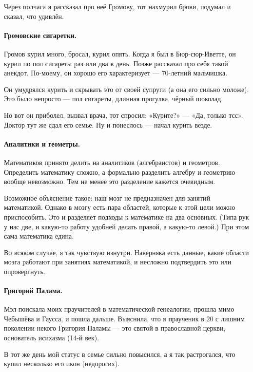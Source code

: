 \documentclass{book}
\begin{document}
Через полчаса я рассказал про неё Громову, тот нахмурил брови, подумал и сказал, что удивлён.

\paragraph{Громовские сигаретки.}
Громов курил много, бросал, курил опять.
Когда я был в Бюр-сюр-Иветте, он курил по пол сигареты раз или два в день.
Позже рассказал про себя такой анекдот.
По-моему, он хорошо его характеризует --- 70-летний мальчишка.

Он умудрялся курить и скрывать это от своей супруги (а она его сильно моложе).
Это было непросто --- пол сигареты, длинная прогулка, чёрный шоколад.

Но вот он приболел, вызвал врача, тот спросил: «Курите?» --- «Да, только тсс».
Доктор тут же сдал его семье.
Ну и понеслось --- начал курить везде.

\paragraph{Аналитики и геометры.}
Математиков принято делить на аналитиков (алгебраистов) и геометров.
Определить математику сложно, а формально разделить алгебру и геометрию вообще невозможно.
Тем не менее это разделение кажется очевидным.

Возможное объяснение такое:
наш мозг не предназначен для занятий математикой.
Однако в мозгу есть пара областей, которые к этой цели можно приспособить.
Это и разделяет подходы к математике на два основных.
(Типа рук у нас две, и какую-то работу удобней делать правой, а какую-то левой.)
При этом сама математика едина.

Во всяком случае, я так чувствую изнутри.
Наверняка есть данные, какие области мозга работают при занятиях математикой,
и несложно подтвердить это или опровергнуть.

\paragraph{Григорий Палама.}
Мэл поискала моих праучителей в математической генеалогии, прошла мимо Чебышёва и Гаусса, и пошла дальше.
Выяснила, что я праученик в 20 с лишним поколении некого Григория Паламы --- это святой в православной церкви, основатель исихазма (14-й век).

В тот же день мой статус в семье сильно повысился, а я так растрогался, что купил несколько его икон (недорогих).
\end{document}
